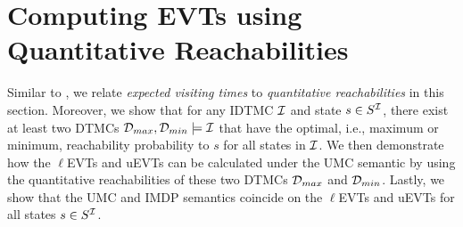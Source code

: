 

\section{Computing EVTs using Quantitative Reachabilities}\label{sec:IMC_Quantitative_Reachability}
Similar to , we relate \textit{expected visiting times} to \textit{quantitative reachabilities} in this section. Moreover, we show that for any IDTMC $\mathcal{I}$ and state $s\in S^{\mathcal{I}}$, there exist at least two DTMCs $\mathcal{D}_{max},\mathcal{D}_{min}\models \mathcal{I}$ that have the optimal, i.e., maximum or minimum, reachability probability to $s$ for all states in $\mathcal{I}$. We then demonstrate how the $\ell$EVTs and uEVTs can be calculated under the UMC semantic by using the quantitative reachabilities of these two DTMCs $\mathcal{D}_{max}$ and $\mathcal{D}_{min}$. 
Lastly, we show that the UMC and IMDP semantics coincide on the $\ell$EVTs and uEVTs for all states $s\in S^{\mathcal{I}}$. 


